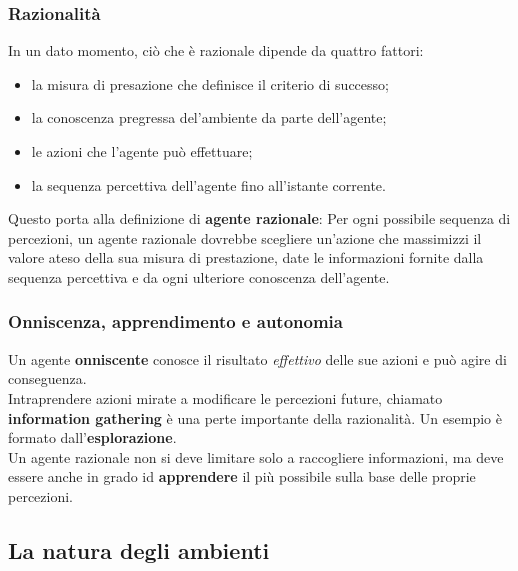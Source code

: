 \documentclass{article}
\begin{document}
\subsubsection{Razionalità}
In un dato momento, ciò che è razionale dipende da quattro fattori:
\begin{itemize}
    \item la misura di presazione che definisce il criterio di successo;
    \item la conoscenza pregressa del'ambiente da parte dell'agente;
    \item le azioni che l'agente può effettuare;
    \item la sequenza percettiva dell'agente fino all'istante corrente.
\end{itemize}
Questo porta alla definizione di \textbf{agente razionale}: Per ogni possibile sequenza di percezioni, un agente razionale dovrebbe scegliere un'azione che massimizzi il valore ateso della sua misura di prestazione, date le informazioni fornite dalla sequenza percettiva e da ogni ulteriore conoscenza dell'agente.
\subsubsection{Onniscenza, apprendimento e autonomia}
Un agente \textbf{onniscente} conosce il risultato \textit{effettivo} delle sue azioni e può agire di conseguenza. \\ Intraprendere azioni mirate a modificare le percezioni future, chiamato \textbf{information gathering} è una perte importante della razionalità. Un esempio è formato dall'\textbf{esplorazione}. \\ Un agente razionale non si deve limitare solo a raccogliere informazioni, ma deve essere anche in grado id \textbf{apprendere} il più possibile sulla base delle proprie percezioni. 

\subsection{La natura degli ambienti}
\end{document}
